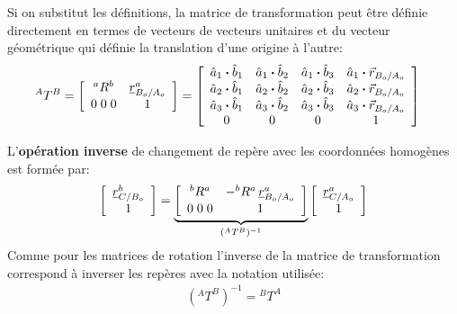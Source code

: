 Si on substitut les définitions, la matrice de transformation peut être définie directement en termes de vecteurs de vecteurs unitaires et du vecteur géométrique qui définie la translation d'une origine à l'autre:
\begin{align}
{}^AT^B &= 
\left[ \begin{array}{c c } 
^aR^b & \underline{r}_{B_o/A_o}^a \\ 0 \; 0 \; 0 & 1
\end{array} \right] 
=
\left[ \begin{array}{c c c c} 
\hat{a}_1 \boldsymbol{\cdot} \hat{b}_1  &  \hat{a}_1 \boldsymbol{\cdot} \hat{b}_2  &  \hat{a}_1 \boldsymbol{\cdot} \hat{b}_3 & \hat{a}_1 \boldsymbol{\cdot} \vec{r}_{B_o/A_o} \\
\hat{a}_2 \boldsymbol{\cdot} \hat{b}_1  &  \hat{a}_2 \boldsymbol{\cdot} \hat{b}_2  &  \hat{a}_2 \boldsymbol{\cdot} \hat{b}_3 & \hat{a}_2 \boldsymbol{\cdot} \vec{r}_{B_o/A_o}\\
\hat{a}_3 \boldsymbol{\cdot} \hat{b}_1  &  \hat{a}_3 \boldsymbol{\cdot} \hat{b}_2  &  \hat{a}_3 \boldsymbol{\cdot} \hat{b}_3 & \hat{a}_3 \boldsymbol{\cdot} \vec{r}_{B_o/A_o} \\
0 & 0 & 0 & 1
\end{array} \right] 
\label{eq:transformationdef}
\end{align} 


L'\textbf{opération inverse} de changement de repère avec les coordonnées homogènes est formée par:
\begin{align}
\left[ \begin{array}{c} 
\underline{r}_{C/B_o}^b \\ 1
\end{array} \right] 
= 
\underbrace{
\left[ \begin{array}{c c } 
^bR^a & - ^bR^a \, \underline{r}_{B_o/A_o}^a \\ 0 \; 0 \; 0 & 1
\end{array} \right] 
}_{ ({}^AT^B)^{-1} }
\left[ \begin{array}{c} 
\underline{r}_{C/A_o}^a \\ 1
\end{array} \right] 
\end{align} 
Comme pour les matrices de rotation l'inverse de la matrice de transformation correspond à inverser les repères avec la notation utilisée:
\begin{align}
({}^AT^B)^{-1}= {}^BT^A
\end{align} 

